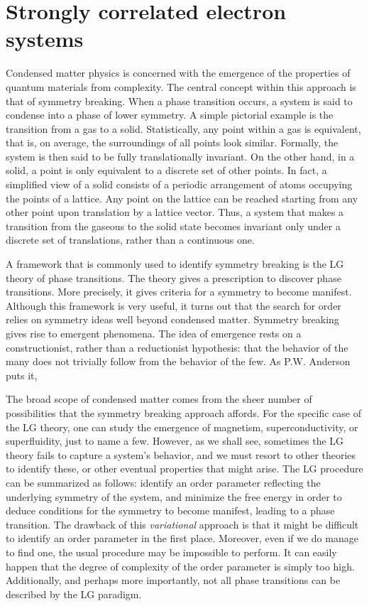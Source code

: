 \section{Strongly correlated electron systems}
\label{sec:strongly_correlated}

Condensed matter physics is concerned with the emergence of the properties of quantum materials from complexity.
The central concept within this approach is that of symmetry breaking.
When a phase transition occurs, a system is said to condense into a phase of lower symmetry.
A simple pictorial example is the transition from a gas to a solid.
Statistically, any point within a gas is equivalent, that is, on average, the surroundings of all points look similar.
Formally, the system is then said to be fully translationally invariant.
On the other hand, in a solid, a point is only equivalent to a discrete set of other points.
In fact, a simplified view of a solid consists of a periodic arrangement of atoms occupying the points of a lattice.
Any point on the lattice can be reached starting from any other point upon translation by a lattice vector.
Thus, a system that makes a transition from the gaseous to the solid state becomes invariant only under a discrete set of translations, rather than a continuous one. 

A framework that is commonly used to identify symmetry breaking is the \ac{LG} theory of phase transitions.
The theory gives a prescription to discover phase transitions.
More precisely, it gives criteria for a symmetry to become manifest.
Although this framework is very useful, it turns out that the search for order relies on symmetry ideas well beyond condensed matter.
Symmetry breaking gives rise to emergent phenomena.
The idea of emergence rests on a constructionist, rather than a reductionist hypothesis: that the behavior of the many does not trivially follow from the behavior of the few.
As P.W. Anderson puts it,  \cite{anderson_more_1972}

The broad scope of condensed matter comes from the sheer number of possibilities that the symmetry breaking approach affords.
For the specific case of the \acs{LG} theory, one can study the emergence of magnetism, superconductivity, or superfluidity, just to name a few.
However, as we shall see, sometimes the \acs{LG} theory fails to capture a system's behavior, and we must resort to other theories to identify these, or other eventual properties that might arise.
The \acl{LG} procedure can be summarized as follows: identify an order parameter reflecting the underlying symmetry of the system, and minimize the free energy in order to deduce conditions for the symmetry to become manifest, leading to a phase transition.
The drawback of this \emph{variational} approach is that it might be difficult to identify an order parameter in the first place.
Moreover, even if we do manage to find one, the usual procedure may be impossible to perform.
It can easily happen that the degree of complexity of the order parameter is simply too high.
Additionally, and perhaps more importantly, not all phase transitions can be described by the LG paradigm.

